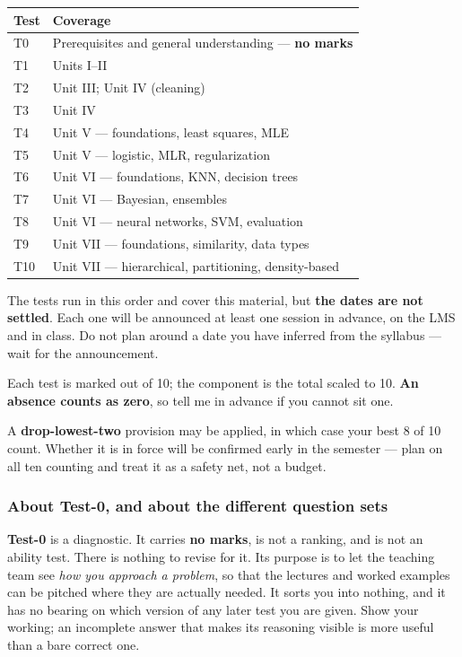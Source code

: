 \documentclass[11pt]{article}
\begin{document}
\begin{center}
\begin{tabular}{@{}lp{10.2cm}@{}}
\toprule
\textbf{Test} & \textbf{Coverage}\\
\midrule
T0 & Prerequisites and general understanding --- \textbf{no marks}\\
T1 & Units I--II\\
T2 & Unit III; Unit IV (cleaning)\\
T3 & Unit IV\\
T4 & Unit V --- foundations, least squares, MLE\\
T5 & Unit V --- logistic, MLR, regularization\\
T6 & Unit VI --- foundations, KNN, decision trees\\
T7 & Unit VI --- Bayesian, ensembles\\
T8 & Unit VI --- neural networks, SVM, evaluation\\
T9 & Unit VII --- foundations, similarity, data types\\
T10 & Unit VII --- hierarchical, partitioning, density-based\\
\bottomrule
\end{tabular}
\end{center}

\begin{caution}
The tests run in this order and cover this material, but \textbf{the dates are
not settled}. Each one will be announced at least one session in advance, on the
LMS and in class. Do not plan around a date you have inferred from the syllabus
--- wait for the announcement.
\end{caution}

Each test is marked out of 10; the component is the total scaled to 10.
\textbf{An absence counts as zero}, so tell me in advance if you cannot sit one.

A \textbf{drop-lowest-two} provision may be applied, in which case your best 8 of
10 count. Whether it is in force will be confirmed early in the semester ---
plan on all ten counting and treat it as a safety net, not a budget.

\subsubsection*{About Test-0, and about the different question sets}

\textbf{Test-0} is a diagnostic. It carries \textbf{no marks}, is not a ranking,
and is not an ability test. There is nothing to revise for it. Its purpose is to
let the teaching team see \emph{how you approach a problem}, so that the lectures
and worked examples can be pitched where they are actually needed. It sorts you
into nothing, and it has no bearing on which version of any later test you are
given. Show your working; an incomplete answer that makes its reasoning visible
is more useful than a bare correct one.
\end{document}
